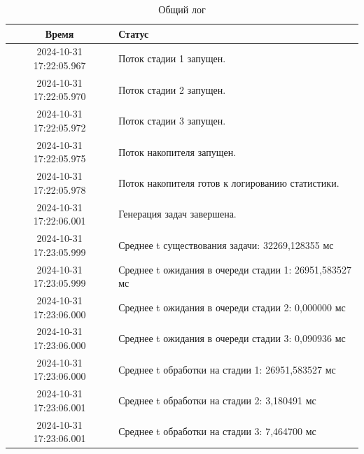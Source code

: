 \begin{table}[h!]
\begin{center}
\begin{threeparttable}
\caption{Общий лог}
\captionsetup{justification=raggedright, singlelinecheck=false}
\label{1-tb}
\begin{tabular}{|c|p{10cm}|}
    \hline
    \textbf{Время} & \textbf{Статус} \\
    \hline
    2024-10-31 17:22:05.967 & Поток стадии 1 запущен. \\
    2024-10-31 17:22:05.970 & Поток стадии 2 запущен. \\
    2024-10-31 17:22:05.972 & Поток стадии 3 запущен. \\
    2024-10-31 17:22:05.975 & Поток накопителя запущен. \\
    2024-10-31 17:22:05.978 & Поток накопителя готов к логированию статистики. \\
    2024-10-31 17:22:06.001 & Генерация задач завершена. \\
    2024-10-31 17:23:05.999 & Среднее t существования задачи: 32269,128355 мс \\
    2024-10-31 17:23:05.999 & Среднее t ожидания в очереди стадии 1: 26951,583527 мс \\
    2024-10-31 17:23:06.000 & Среднее t ожидания в очереди стадии 2: 0,000000 мс \\
    2024-10-31 17:23:06.000 & Среднее t ожидания в очереди стадии 3: 0,090936 мс \\
    2024-10-31 17:23:06.000 & Среднее t обработки на стадии 1: 26951,583527 мс \\
    2024-10-31 17:23:06.001 & Среднее t обработки на стадии 2: 3,180491 мс \\
    2024-10-31 17:23:06.001 & Среднее t обработки на стадии 3: 7,464700 мс \\
    \hline
\end{tabular}
\end{threeparttable}
\end{center}
\end{table}

